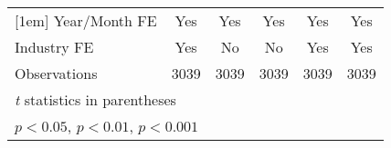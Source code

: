 \begin{table}[htbp]
\begin{tabular}{l*{5}{c}}
[1em]
Year/Month FE       &         Yes         &         Yes         &         Yes         &         Yes         &         Yes         \\
[1em]
Industry FE         &         Yes         &          No         &          No         &         Yes         &         Yes         \\
\hline
Observations        &        3039         &        3039         &        3039         &        3039         &        3039         \\
\hline\hline
\multicolumn{6}{l}{\footnotesize \textit{t} statistics in parentheses}\\
\multicolumn{6}{l}{\footnotesize \sym{*} \(p<0.05\), \sym{**} \(p<0.01\), \sym{***} \(p<0.001\)}\\
\end{tabular}
\end{table}
